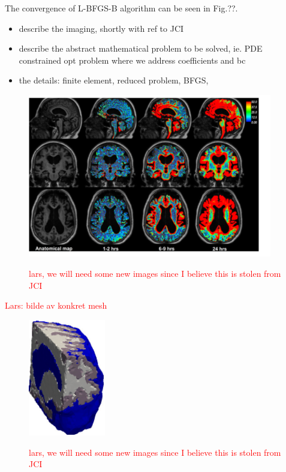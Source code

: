 \documentclass[11pt,a4paper]{article}
\renewcommand{\comment}[1]{\textcolor{red}{#1}}
\begin{document}
 


The convergence of L-BFGS-B algorithm can be seen in Fig.??. 
\begin{itemize}
\item describe the imaging, shortly with ref to JCI  
\item describe the abstract mathematical problem to be solved, ie. PDE constrained opt problem where we 
address coefficients and bc  
\item the details: finite element, reduced problem, BFGS,  
\end{itemize}

\begin{figure}
\includegraphics[width=0.95\textwidth]{GMRI.png} 
\label{fig1} 
\caption{\comment{lars, we will need some new images since I believe this is stolen from JCI}}
\end{figure}

\comment{Lars: bilde av konkret mesh  }

\begin{figure}
\includegraphics[width=0.3\textwidth]{mesh-eps-converted-to.pdf} 
\label{fig1} 
\caption{\comment{lars, we will need some new images since I believe this is stolen from JCI}}
\end{figure}
\end{document}
